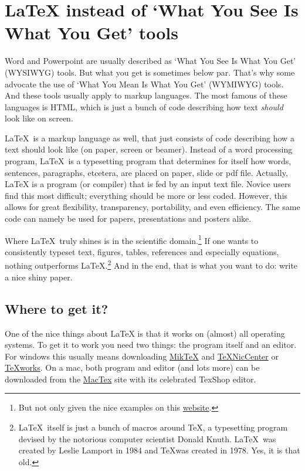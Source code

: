 \documentclass[preprint,authoryear,3p]{elsarticle}
\begin{document}
\section{\LaTeX \: instead of `What You See Is What You Get' tools} Word and Powerpoint are usually described as `What You See Is What You Get' (WYSIWYG) tools. But what you get is sometimes below par. That's why some advocate the use of `What You Mean Is What You Get' (WYMIWYG) tools. And these tools usually apply to markup languages. The most famous of these languages is HTML, which is just a bunch of code describing how text \emph{should} look like on screen. 

\LaTeX \ is a markup language as well, that just consists of code describing how a text should look like (on paper, screen or beamer). Instead of a word processing program, \LaTeX \ is a typesetting program that determines for itself how words, sentences, paragraphs, etcetera, are placed on paper, slide or pdf file. Actually, \LaTeX{} is a program (or compiler) that is fed by an input text file. Novice users find this most difficult; everything should be more or less coded. However, this allows for great flexibility, transparency, portability, and even efficiency. The same code can namely be used for papers, presentations and posters alike.

Where \LaTeX \ truly shines is in the scientific domain.\footnote{But not only given the nice examples on this \href{http://www.tug.org/texshowcase/}{website}.} If one wants to consistently typeset text, figures, tables, references and especially equations, nothing outperforms {\LaTeX}.\footnote{\LaTeX \ itself is just a bunch of macros around \TeX, a typesetting program devised by the notorious computer scientist Donald Knuth. \LaTeX\ was created by Leslie Lamport in 1984 and \TeX was created in 1978. Yes, it is that old.} And in the end, that is what you want to do: write a nice shiny paper. 

\subsection{Where to get it?}

One of the nice things about {\LaTeX} is that it works on (almost) all operating systems. To get it to work you need two things: the program itself and an editor. For windows this usually means downloading \href{http://miktex.org/}{MikTeX} and \href{http://www.texniccenter.org/}{TeXNicCenter} or \href{http://www.tug.org/texworks//}{TeXworks}. On a mac, both program and editor (and lots more) can be downloaded from the \href{http://tug.org/mactex/}{MacTex} site with its celebrated TexShop editor. 
\end{document}
